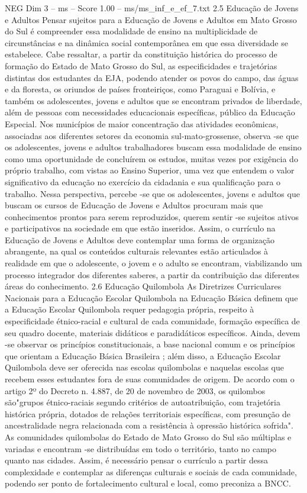 \begin{textsample}{NEG Dim 3 – ms – Score 1.00 – ms/ms\_inf\_e\_ef\_7.txt}  \label{ex:f3_neg_092}
2.5 Educação de Jovens e Adultos Pensar sujeitos para a Educação de Jovens e Adultos em Mato Grosso do Sul é compreender essa modalidade de ensino na multiplicidade de circunstâncias e na dinâmica social contemporânea em que essa diversidade se estabelece.
Cabe ressaltar, a partir da constituição histórica do processo de formação do Estado de Mato Grosso do Sul, as especificidades e trajetórias distintas dos estudantes da EJA, podendo atender os povos do campo, das águas e da floresta, os oriundos de países fronteiriços, como Paraguai e Bolívia, e também os adolescentes, jovens e adultos que se encontram privados de liberdade, além de pessoas com necessidades educacionais específicas, público da Educação Especial.
Nos municípios de maior concentração das atividades econômicas, associadas aos diferentes setores da economia sul-mato-grossense, observa -se que os adolescentes, jovens e adultos trabalhadores buscam essa modalidade de ensino como uma oportunidade de concluírem os estudos, muitas vezes por exigência do próprio trabalho, com vistas ao Ensino Superior, uma vez que entendem o valor significativo da educação no exercício da cidadania e sua qualificação para o trabalho.
Nessa perspectiva, percebe -se que os adolescentes, jovens e adultos que buscam os cursos de Educação de Jovens e Adultos procuram mais que conhecimentos prontos para serem reproduzidos, querem sentir -se sujeitos ativos e participativos na sociedade em que estão inseridos.
Assim, o currículo na Educação de Jovens e Adultos deve contemplar uma forma de organização abrangente, na qual os conteúdos culturais relevantes estão articulados à realidade em que o adolescente, o jovem e o adulto se encontram, viabilizando um processo integrador dos diferentes saberes, a partir da contribuição das diferentes áreas do conhecimento. 2.6 Educação Quilombola As Diretrizes Curriculares Nacionais para a Educação Escolar Quilombola na Educação Básica definem que a Educação Escolar Quilombola requer pedagogia própria, respeito à especificidade étnico-racial e cultural de cada comunidade, formação específica de seu quadro docente, materiais didáticos e paradidáticos específicos.
Ainda, devem -se observar os princípios constitucionais, a base nacional comum e os princípios que orientam a Educação Básica Brasileira ; além disso, a Educação Escolar Quilombola deve ser oferecida nas escolas quilombolas e naquelas escolas que recebem esses estudantes fora de suas comunidades de origem.
De acordo com o artigo 2º do Decreto n. 4.887, de 20 de novembro de 2003, os quilombos são"grupos étnico-raciais segundo critérios de autoatribuição, com trajetória histórica própria, dotados de relações territoriais específicas, com presunção de ancestralidade negra relacionada com a resistência à opressão histórica sofrida".
As comunidades quilombolas do Estado de Mato Grosso do Sul são múltiplas e variadas e encontram -se distribuídas em todo o território, tanto no campo quanto nas cidades.
Assim, é necessário pensar o currículo a partir dessa complexidade e contemplar as diferenças culturais e sociais de cada comunidade, podendo ser ponto de fortalecimento cultural e local, como preconiza a BNCC.

\end{textsample}
